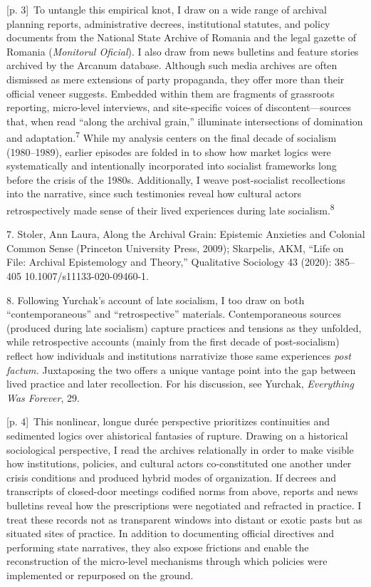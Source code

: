 \documentclass[10pt,a4paper]{article}
\begin{document}
{\scriptsize\color{gray} [p. 3]}\ To untangle this empirical knot, I draw on a wide range of archival planning reports, administrative decrees, institutional statutes, and policy documents from the National State Archive of Romania and the legal gazette of Romania (\textit{Monitorul Oficial}). I also draw from news bulletins and feature stories archived by the Arcanum database. Although such media archives are often dismissed as mere extensions of party propaganda, they offer more than their official veneer suggests. Embedded within them are fragments of grassroots reporting, micro-level interviews, and site-specific voices of discontent—sources that, when read “along the archival grain,” illuminate intersections of domination and adaptation.\nobreak\textsuperscript{7} While my analysis centers on the final decade of socialism (1980–1989), earlier episodes are folded in to show how market logics were systematically and intentionally incorporated into socialist frameworks long before the crisis of the 1980s. Additionally, I weave post-socialist recollections into the narrative, since such testimonies reveal how cultural actors retrospectively made sense of their lived experiences during late socialism.\nobreak\textsuperscript{8}\par{\small 7. Stoler, Ann Laura, Along the Archival Grain: Epistemic Anxieties and Colonial Common Sense (Princeton University Press, 2009); Skarpelis, AKM, “Life on File: Archival Epistemology and Theory,” Qualitative Sociology 43 (2020): 385–405 10.1007/s11133-020-09460-1.\par}{\small 8. Following Yurchak’s account of late socialism, I too draw on both “contemporaneous” and “retrospective” materials. Contemporaneous sources (produced during late socialism) capture practices and tensions as they unfolded, while retrospective accounts (mainly from the first decade of post-socialism) reflect how individuals and institutions narrativize those same experiences \textit{post factum.} Juxtaposing the two offers a unique vantage point into the gap between lived practice and later recollection. For his discussion, see Yurchak, \textit{Everything Was Forever}, 29.\par}
{\scriptsize\color{gray} [p. 4]}\ This nonlinear, longue durée perspective prioritizes continuities and sedimented logics over ahistorical fantasies of rupture. Drawing on a historical sociological perspective, I read the archives relationally in order to make visible how institutions, policies, and cultural actors co-constituted one another under crisis conditions and produced hybrid modes of organization. If decrees and transcripts of closed-door meetings codified norms from above, reports and news bulletins reveal how the prescriptions were negotiated and refracted in practice. I treat these records not as transparent windows into distant or exotic pasts but as situated sites of practice. In addition to documenting official directives and performing state narratives, they also expose frictions and enable the reconstruction of the micro-level mechanisms through which policies were implemented or repurposed on the ground.\par
\end{document}
